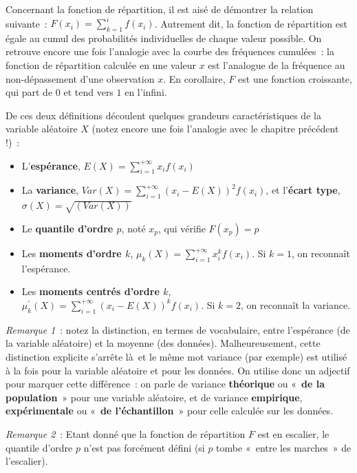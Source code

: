 \documentclass[
]{book}
\providecommand{\tightlist}{%
  \setlength{\itemsep}{0pt}\setlength{\parskip}{0pt}}
\begin{document}
Concernant la fonction de répartition, il est aisé de démontrer la relation suivante~: \(F(x_i)=\sum_{k=1}^{i}f(x_i)\). Autrement dit, la fonction de répartition est égale au cumul des probabilités individuelles de chaque valeur possible. On retrouve encore une fois l'analogie avec la courbe des fréquences cumulées~: la fonction de répartition calculée en une valeur \(x\) est l'analogue de la fréquence au non-dépassement d'une observation \(x\).
En corollaire, \(F\) est une fonction croissante, qui part de \(0\) et tend vers \(1\) en l'infini.

De ces deux définitions découlent quelques grandeurs caractéristiques de la variable aléatoire \(X\) (notez encore une fois l'analogie avec le chapitre précédent !)~:

\begin{itemize}
\tightlist
\item
  L'\textbf{espérance}, \(E(X)=\sum_{i=1}^{+\infty}x_i f(x_i)\)
\item
  La \textbf{variance}, \(Var(X)=\sum_{i=1}^{+\infty}(x_i-E(X))^2 f(x_i)\), et l'\textbf{écart type}, \(\sigma(X)=\sqrt{\left( Var(X) \right)}\)
\item
  Le \textbf{quantile d'ordre \(p\)}, noté \(x_p\), qui vérifie \(F(x_p)=p\)
\item
  Les \textbf{moments d'ordre \(k\)}, \(\mu_k(X)=\sum_{i=1}^{+\infty}x_i^k f(x_i)\). Si \(k=1\), on reconnaît l'espérance.
\item
  Les \textbf{moments centrés d'ordre \(k\)}, \(\mu^\prime_k(X)=\sum_{i=1}^{+\infty}(x_i-E(X))^k f(x_i)\). Si \(k=2\), on reconnaît la variance.
\end{itemize}

\emph{Remarque 1}~: notez la distinction, en termes de vocabulaire, entre l'espérance (de la variable aléatoire) et la moyenne (des données). Malheureusement, cette distinction explicite s'arrête là~et le même mot variance (par exemple) est utilisé à la fois pour la variable aléatoire et pour les données. On utilise donc un adjectif pour marquer cette différence~: on parle de variance \textbf{théorique} ou «~\textbf{de la population}~» pour une variable aléatoire, et de variance \textbf{empirique}, \textbf{expérimentale} ou «~\textbf{de l'échantillon}~» pour celle calculée sur les données.

\emph{Remarque 2}~: Etant donné que la fonction de répartition \(F\) est en escalier, le quantile d'ordre \(p\) n'est pas forcément défini (si \(p\) tombe «~entre les marches~» de l'escalier).
\end{document}
